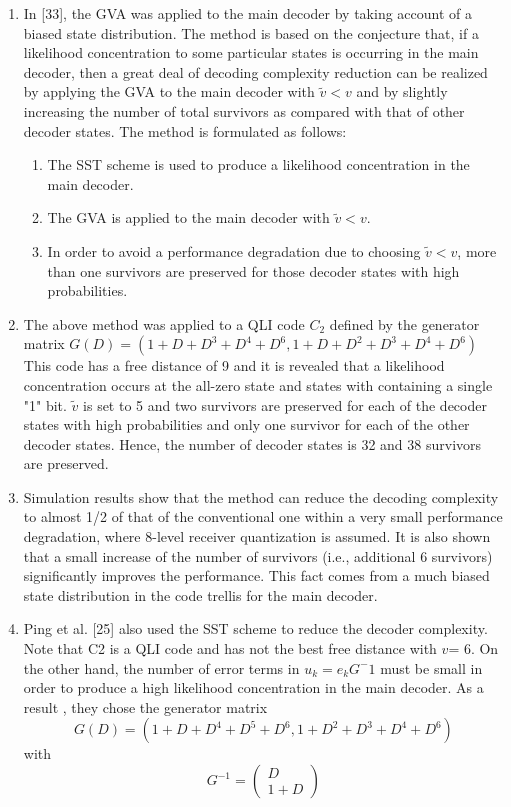 \documentclass[fontsize=12pt]{article}
\theoremstyle{definition}
\begin{document}
\begin{enumerate}
\item In [33], the GVA was applied to the main decoder by
taking account of a biased state distribution. The method is
based on the conjecture that, if a likelihood concentration
to some particular states is occurring in the main decoder,
then a great deal of decoding complexity reduction can be
realized by applying the GVA to the main decoder with $\tilde{v} < v$ and by slightly increasing the number of total
survivors as compared with that of other decoder states. The method
is formulated as follows:
\begin{enumerate}
\item The SST scheme is used to produce a likelihood concentration
in the main decoder.
\item The GVA is applied to the main decoder with $\tilde{v} < v$.
\item In order to avoid a performance degradation due to
choosing $\tilde{v} < v$, more than one survivors are
preserved for those decoder states with high probabilities.
\end{enumerate}
\item The above method  was applied to a QLI code $C_2$ defined by the generator matrix $G(D) = (1 +D+D^3 +D^4 +D^6, 1 +D+D^2+D^3+D^4+D^6)$ This code has a free distance of 9 and it is revealed that a likelihood concentration occurs at the all-zero state and states with containing a single "1" bit. $\tilde{v}$ is set to 5 and two survivors are preserved for each of the decoder
states with high probabilities and only one survivor for each
of the other decoder states.  Hence, the number of decoder
states is 32 and 38 survivors are preserved.

\item Simulation results
show that the method can reduce the decoding complexity to
almost 1/2 of that of the conventional one within a very small
performance degradation, where 8-level receiver quantization
is assumed. It is also shown that a small increase of the number
of survivors (i.e., additional 6 survivors) significantly improves
the performance. This fact comes from a much biased state
distribution in the code trellis for the main decoder. 

\item Ping et al. [25] also used the SST scheme to reduce the
decoder complexity. Note that C2 is a QLI code and has not
the best free distance  with $v$= 6. On the other hand, the number of
error terms in $u_k = e_kG^-1$ must be small in order to produce a
high likelihood concentration in the main decoder. As a result
, they chose the generator matrix
$$G(D) = (1 +D+D^4 +D^5 +D^6, 1 +D^2+D^3+D^4+D^6)$$ with
\begin{equation}
G^{-1}= \left(\begin{array}{c}
D \\ 1 + D
\end{array}\right)
\end{equation}


\end{enumerate}
\end{document}
